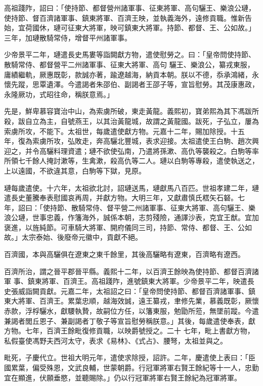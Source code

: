\begin{pinyinscope}
 高祖踐阼，詔曰：「使持節、都督營州諸軍事、征東將軍、高句驪王、樂浪公璉，使持節、督百濟諸軍事、鎮東將軍、百濟王映，並執義海外，遠修貢職。惟新告始，宜荷國休，璉可征東大將軍，映可鎮東大將軍。持節、都督、王、公如故。」三年，加璉散騎常侍，增督平州諸軍事。



 少帝景平二年，璉遣長史馬婁等詣闕獻方物，遣使慰勞之。曰：「皇帝問使持節、散騎常侍、都督營平二州諸軍事、征東大將軍、高句
 驪王、樂浪公，纂戎東服，庸績繼軌，厥惠既彰，款誠亦著，踰遼越海，納貢本朝。朕以不德，忝承鴻緒，永懷先蹤，思覃遺澤。今遣謁者朱邵伯、副謁者王邵子等，宣旨慰勞。其茂康惠政，永隆厥功，式昭往命，稱朕意焉。」



 先是，鮮卑慕容寶治中山，為索虜所破，東走黃龍。義熙初，寶弟熙為其下馮跋所殺，跋自立為主，自號燕王，以其治黃龍城，故謂之黃龍國。跋死，子弘立，屢為索虜所攻，不能下。太祖世，每歲遣使獻方物。元嘉十二年，賜加除授。十五
 年，復為索虜所攻，弘敗走，奔高驪北豐城，表求迎接。太祖遣使王白駒、趙次興迎之，并令高驪料理資遣；璉不欲使弘南，乃遣將孫漱、高仇等襲殺之。白駒等率所領七千餘人掩討漱等，生禽漱，殺高仇等二人。璉以白駒等專殺，遣使執送之，上以遠國，不欲違其意，白駒等下獄，見原。



 璉每歲遣使。十六年，太祖欲北討，詔璉送馬，璉獻馬八百匹。世祖孝建二年，璉遣長史董騰奉表慰國哀再周，并獻方物。大明三年，又獻肅慎氏楛矢石砮。七
 年，詔曰：「使持節、散騎常侍、督平營二州諸軍事、征東大將軍、高句驪王、樂浪公璉，世事忠義，作籓海外，誠係本朝，志剪殘險，通譯沙表，克宜王猷。宜加褒進，以旌純節。可車騎大將軍、開府儀同三司，持節、常侍、都督、王、公如故。」太宗泰始、後廢帝元徽中，貢獻不絕。



 百濟國，本與高驪俱在遼東之東千餘里，其後高驪略有遼東，百濟略有遼西。



 百濟所治，謂之晉平郡晉平縣。義熙十二年，以百濟王餘映為使持節、都督百濟諸軍
 事、鎮東將軍、百濟王。高祖踐阼，進號鎮東大將軍。少帝景平二年，映遣長史張威詣闕貢獻。元嘉二年，太祖詔之曰：「皇帝問使持節、都督百濟諸軍事、鎮東大將軍、百濟王。累葉忠順，越海效誠，遠王纂戎，聿修先業，慕義既彰，厥懷赤款，浮桴驪水，獻騕執贄，故嗣位方任，以籓東服，勉勖所蒞，無墜前蹤。今遣兼謁者閭丘恩子、兼副謁者丁敬子等宣旨慰勞稱朕意。」其後，每歲遣使奉表，獻方物。七年，百濟王餘毗復修貢職，以映爵號授之。二十
 七年，毗上書獻方物，私假臺使馮野夫西河太守，表求《易林》、《式占》、腰弩，太祖並與之。



 毗死，子慶代立。世祖大明元年，遣使求除授，詔許。二年，慶遣使上表曰：「臣國累葉，偏受殊恩，文武良輔，世蒙朝爵。行冠軍將軍右賢王餘紀等十一人，忠勤宜在顯進，伏願垂愍，並聽賜除。」仍以行冠軍將軍右賢王餘紀為冠軍將軍。




\end{pinyinscope}
